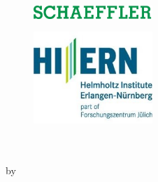 \thispagestyle{empty}

\begin{addmargin}[-1cm]{-3cm}
	\begin{center}

		\begin{figure}[t]
		    \begin{minipage}[]{7cm}
		        \flushleft
		        \includegraphics[width=4.5cm]{gfx/essential/schaeffler.png}\\
		    \end{minipage}
		    \begin{minipage}[]{7cm}
		        \flushright
		        \includegraphics[width=4.5cm]{gfx/essential/HIERN.jpg}\\
		    \end{minipage}
		\end{figure}


		\enlargethispage{20mm}
		\vspace{10mm}

		\begin{center}
			\vspace*{35mm}	
			\begin{minipage}{.7\textwidth}
				\centering
				{\Large{\myTitle}}
			\end{minipage}																				\\
			\vspace*{10mm}		{\textbf{\MakeUppercase{\mySubtitle}}}										\\
			\vfill
			\vspace*{15mm}	    by															\\
			\vspace*{3mm}		{\large\textbf \myName}												\\
			\vspace*{12mm}	    \submission														\\
		\end{center}


\end{center}
\end{addmargin}
